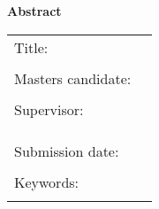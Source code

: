 \thispagestyle{plain}
\vspace*{11pt}
\begin{center}
	{\LARGE \textbf{\textsf{Abstract}}}
\end{center}

\bigskip

\begin{center}
	\begin{tabular}{p{3.2cm}p{9.6cm}}
		Title: & \themaEn \\
		 & \\
		Masters candidate: & \autor \\
		 & \\
		Supervisor: & \firmaEn \\[1.1ex] & \prueferA  \\[.5ex]
		 &  \prueferB \\
		 & \\
		Submission date: & \abgabedatum \\
		 & \\
		Keywords: & \schlagworteEn \\
		 & \\
	\end{tabular}
\end{center}

\bigskip

\noindent
\zusammenfassungEn